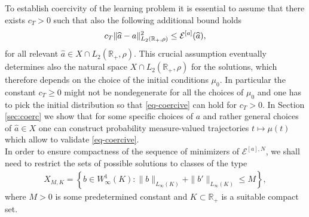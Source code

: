 To establish coercivity of the learning problem
it is essential  to assume that there exists  $c_T>0$ such that also the following additional bound holds
\begin{align}\label{eq-coercive}%
	c_T \| \widehat a - a \|^2_{L_2(\mathbb R_+,\rho)} \leq \Eahat,
\end{align}
for all relevant $\widehat a \in X \cap  L_2(\mathbb R_+,\rho)$. This crucial assumption eventually determines also the natural space $X \cap  L_2(\mathbb R_+,\rho)$ for the solutions,
which therefore depends on the choice of the initial conditions $\mu_0$. In particular the constant $c_T\geq 0$ might not be nondegenerate for all the choices of $\mu_0$
and one has to pick the initial distribution so that \eqref{eq-coercive} can hold for $c_T >0$. 
In Section \ref{sec:coerc} we show that for some specific choices of $a$ and rather general choices of $\widehat a \in X$ one can construct probability measure-valued trajectories $t \mapsto \mu(t)$ which allow to validate
\eqref{eq-coercive}.\\
In order to ensure compactness of the sequence of minimizers of $\mathcal E^{[a],N}$, we shall need to restrict the sets of possible solutions to classes of the type
\begin{align*}
X_{M,K} = \left\{b \in W^{1}_{\infty}(K) :
 \|b\|_{L_{\infty}(K)} + \|b'\|_{L_{\infty}(K)} \leq M
 \right\},
\end{align*}
where $M>0$ is some predetermined constant and $K \subset \mathbb R_+$ is a suitable compact set.


